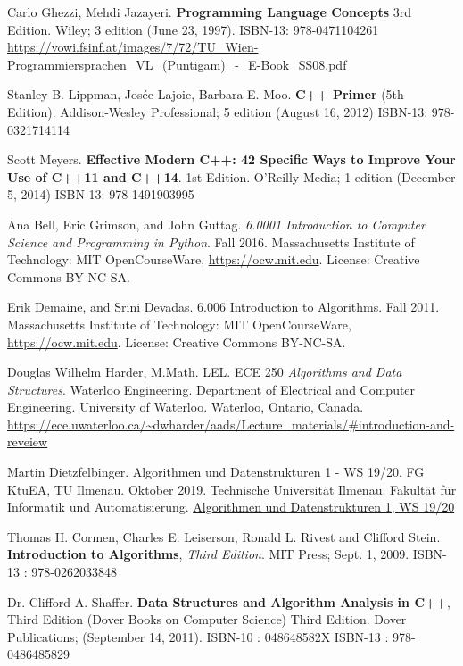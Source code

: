 \documentclass[10pt]{amsart}
\begin{document}
\begin{thebibliography}{9}
Carlo Ghezzi, Mehdi Jazayeri.  \textbf{Programming Language Concepts} 3rd Edition.  Wiley; 3 edition (June 23, 1997).  ISBN-13: 978-0471104261  \url{https://vowi.fsinf.at/images/7/72/TU_Wien-Programmiersprachen_VL_(Puntigam)_-_E-Book_SS08.pdf}

Stanley B. Lippman, Jos\'{e}e Lajoie, Barbara E. Moo. \textbf{C++ Primer} (5th Edition).  Addison-Wesley Professional; 5 edition (August 16, 2012) ISBN-13: 978-0321714114 

Scott Meyers.  \textbf{Effective Modern C++: 42 Specific Ways to Improve Your Use of C++11 and C++14}. 1st Edition.  O'Reilly Media; 1 edition (December 5, 2014)  ISBN-13: 978-1491903995

Ana Bell, Eric Grimson, and John Guttag. \emph{6.0001 Introduction to Computer Science and Programming in Python}. Fall 2016. Massachusetts Institute of Technology: MIT OpenCourseWare, \url{https://ocw.mit.edu}. License: Creative Commons BY-NC-SA.

Erik Demaine, and Srini Devadas. 6.006 Introduction to Algorithms. Fall 2011. Massachusetts Institute of Technology: MIT OpenCourseWare, \url{https://ocw.mit.edu}. License: Creative Commons BY-NC-SA.


Douglas Wilhelm Harder, M.Math. LEL. ECE 250 \emph{Algorithms and Data Structures}. Waterloo Engineering. Department of Electrical and Computer Engineering. University of Waterloo. Waterloo, Ontario, Canada. \url{https://ece.uwaterloo.ca/~dwharder/aads/Lecture_materials/#introduction-and-reveiew}

Martin Dietzfelbinger. Algorithmen und Datenstrukturen 1 - WS 19/20. FG KtuEA, TU Ilmenau. Oktober 2019. Technische Universit\"{a}t Ilmenau. Fakult\"{a}t f\"{u}r Informatik und Automatisierung. \href{https://www.tu-ilmenau.de/en/institute-of-theoretical-computer-science/lehre/lehre-ws-20192020/aud-1/}{Algorithmen und Datenstrukturen 1, WS 19/20}

Thomas H. Cormen, Charles E. Leiserson, Ronald L. Rivest and Clifford Stein.  \textbf{Introduction to Algorithms}, \emph{Third Edition}. MIT Press; Sept. 1, 2009.  ISBN-13 : 978-0262033848 

Dr. Clifford A. Shaffer. 
\textbf{Data Structures and Algorithm Analysis in C++}, Third Edition (Dover Books on Computer Science) Third Edition. Dover Publications; (September 14, 2011). ISBN-10 : 048648582X ISBN-13 : 978-0486485829 



\end{thebibliography}
\end{document}
